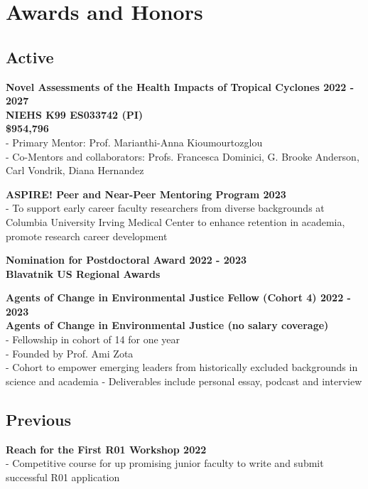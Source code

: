 \section*{Awards and Honors}

\subsection*{Active}

\noindent \textbf{Novel Assessments of the Health Impacts of Tropical Cyclones \hfill 2022 - 2027\\ 
NIEHS K99 ES033742 (PI)\\ 
\$954,796}\\
- Primary Mentor: Prof. Marianthi-Anna Kioumourtozglou\\
- Co-Mentors and collaborators: Profs. Francesca Dominici, G. Brooke Anderson, Carl Vondrik, Diana Hernandez \medskip

\noindent \textbf{ASPIRE! Peer and Near-Peer Mentoring Program  \hfill 2023} \\
- To support early career faculty researchers from diverse backgrounds at Columbia University Irving Medical Center to enhance retention in academia, promote research career development \medskip

\noindent \textbf{Nomination for Postdoctoral Award  \hfill 2022 - 2023 \\
Blavatnik US Regional Awards}
\medskip

\noindent \textbf{Agents of Change in Environmental Justice Fellow (Cohort 4) \hfill 2022 - 2023\\
Agents of Change in Environmental Justice (no salary coverage)}\\
- Fellowship in cohort of 14 for one year\\
- Founded by Prof. Ami Zota\\
- Cohort to empower emerging leaders from historically excluded backgrounds in science and academia 
- Deliverables include personal essay, podcast and interview %

\subsection*{Previous}

\noindent \textbf{Reach for the First R01 Workshop \hfill 2022}\\ 
- Competitive course for up promising junior faculty to write and submit successful R01 application \medskip

